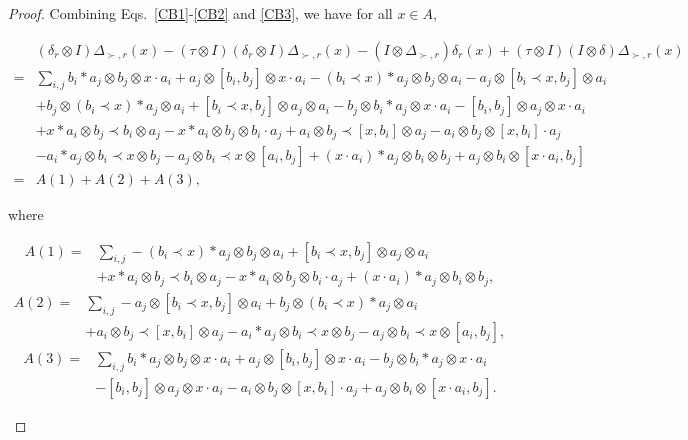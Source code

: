 \documentclass[12pt]{amsart}
\theoremstyle{definition}
\begin{document}
\begin{proof}
Combining Eqs.~\eqref{CB1}-\eqref{CB2} and \eqref{CB3}, we have for all $x\in A$, 
\begin{small}
\begin{align*}&(\delta_{r}\otimes I)\Delta_{\succ,r}(x)-
(\tau\otimes I)(\delta_{r}\otimes I)\Delta_{\succ,r}(x)-(I\otimes \Delta_{\succ,r})\delta_{r}(x)
+(\tau\otimes I)(I\otimes \delta)\Delta_{\succ,r}(x)\\=&
\sum_{i,j}b_i\ast a_j\otimes b_j\otimes x\cdot a_i+a_j\otimes [b_i,b_j]\otimes x\cdot a_i-(b_i\prec x)\ast a_j\otimes b_j\otimes a_i
-a_j\otimes [b_i\prec x,b_j]\otimes a_i\\&
+b_j\otimes (b_i\prec x)\ast a_j\otimes a_i+ [b_i\prec x,b_j]\otimes a_j\otimes a_i
-b_j\otimes b_i\ast a_j\otimes  x\cdot a_i-[b_i,b_j]\otimes a_j\otimes  x\cdot a_i
\\&+ x\ast a_i\otimes b_j\prec b_i\otimes a_j-x\ast a_i\otimes b_j\otimes b_i\cdot a_j
+a_i\otimes b_j\prec [x,b_i]\otimes a_j-a_i\otimes b_j\otimes[x,b_i]\cdot a_j
\\&-a_i\ast a_j\otimes b_i\prec x\otimes b_j-a_j\otimes b_i\prec x\otimes [a_i,b_j]
+(x\cdot a_i)\ast a_j\otimes b_i\otimes b_j+a_j\otimes b_i \otimes [x\cdot a_i,b_j]\\=&A(1)+A(2)+A(3),
\end{align*}
\end{small}
where
\begin{small}
\begin{align*}A(1)=&\sum_{i,j}-(b_i\prec x)\ast a_j\otimes b_j\otimes a_i
+ [b_i\prec x,b_j]\otimes a_j\otimes a_i
\\&+ x\ast a_i\otimes b_j\prec b_i\otimes a_j-x\ast a_i\otimes b_j\otimes b_i\cdot a_j
+(x\cdot a_i)\ast a_j\otimes b_i\otimes b_j,
\end{align*}
\begin{align*}A(2)=&\sum_{i,j}-a_j\otimes [b_i\prec x,b_j]\otimes a_i
+b_j\otimes (b_i\prec x)\ast a_j\otimes a_i
\\&+a_i\otimes b_j\prec [x,b_i]\otimes a_j
-a_i\ast a_j\otimes b_i\prec x\otimes b_j-a_j\otimes b_i\prec x\otimes [a_i,b_j],\end{align*}
\begin{align*}A(3)=&\sum_{i,j}b_i\ast a_j\otimes b_j\otimes x\cdot a_i+a_j\otimes [b_i,b_j]\otimes x\cdot a_i
-b_j\otimes b_i\ast a_j\otimes  x\cdot a_i\\&-[b_i,b_j]\otimes a_j\otimes  x\cdot a_i
-a_i\otimes b_j\otimes[x,b_i]\cdot a_j
+a_j\otimes b_i \otimes [x\cdot a_i,b_j].\end{align*}\end{small}

\end{proof}
\end{document}
